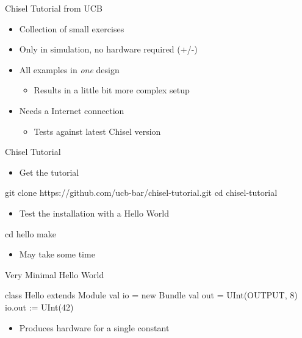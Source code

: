 \documentclass[xcolor=pdflatex,dvipsnames,table]{beamer}
\begin{document}
\begin{frame}[fragile]{Chisel Tutorial from UCB}
\begin{itemize}
\item Collection of small exercises
\item Only in simulation, no hardware required (+/-)
\item All examples in \emph{one} design
\begin{itemize}
\item Results in a little bit more complex setup
\end{itemize}
\item Needs a Internet connection
\begin{itemize}
\item  Tests against latest Chisel version
\end{itemize}
\end{itemize}
\end{frame}

\begin{frame}[fragile]{Chisel Tutorial}
\begin{itemize}
\item Get the tutorial
\end{itemize}
\begin{chisel}
git clone https://github.com/ucb-bar/chisel-tutorial.git
cd chisel-tutorial
\end{chisel}
\begin{itemize}
\item Test the installation with a Hello World
\end{itemize}
\begin{chisel}
cd hello
make
\end{chisel}
\begin{itemize}
\item May take some time
\end{itemize}
\end{frame}

\begin{frame}[fragile]{Very Minimal Hello World}
\begin{chisel}
class Hello extends Module {
  val io = new Bundle { 
    val out = UInt(OUTPUT, 8)
  }
  io.out := UInt(42)
}
\end{chisel}
\begin{itemize}
\item Produces hardware for a single constant
\end{itemize}
\end{frame}
\end{document}
